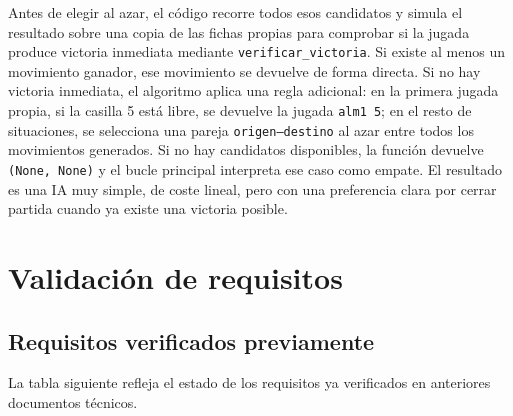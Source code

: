 \documentclass[12pt,a4paper]{article}
\begin{document}
Antes de elegir al azar, el c\'odigo recorre todos esos candidatos y simula el resultado sobre una copia de las fichas propias para comprobar si la jugada produce victoria inmediata mediante \texttt{verificar\_victoria}. Si existe al menos un movimiento ganador, ese movimiento se devuelve de forma directa. Si no hay victoria inmediata, el algoritmo aplica una regla adicional: en la primera jugada propia, si la casilla 5 est\'a libre, se devuelve la jugada \texttt{alm1 5}; en el resto de situaciones, se selecciona una pareja \texttt{origen--destino} al azar entre todos los movimientos generados. Si no hay candidatos disponibles, la funci\'on devuelve \texttt{(None, None)} y el bucle principal interpreta ese caso como empate. El resultado es una IA muy simple, de coste lineal, pero con una preferencia clara por cerrar partida cuando ya existe una victoria posible.
\section{Validaci\'on de requisitos}

\subsection{Requisitos verificados previamente}
La tabla siguiente refleja el estado de los requisitos ya verificados en anteriores documentos técnicos.
\end{document}
